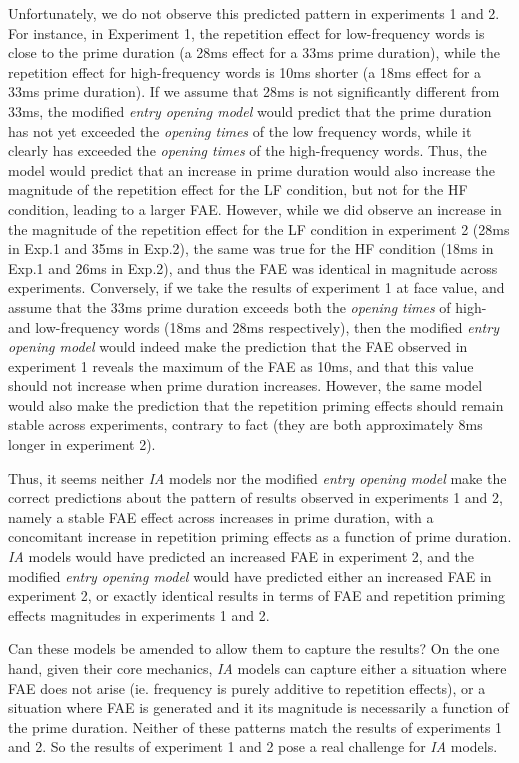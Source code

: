 \documentclass[
]{interact}
\begin{document}
Unfortunately, we do not observe this predicted pattern in experiments 1
and 2. For instance, in Experiment 1, the repetition effect for
low-frequency words is close to the prime duration (a 28ms effect for a
33ms prime duration), while the repetition effect for high-frequency
words is 10ms shorter (a 18ms effect for a 33ms prime duration). If we
assume that 28ms is not significantly different from 33ms, the modified
\emph{entry opening model} would predict that the prime duration has not
yet exceeded the \emph{opening times} of the low frequency words, while
it clearly has exceeded the \emph{opening times} of the high-frequency
words. Thus, the model would predict that an increase in prime duration
would also increase the magnitude of the repetition effect for the LF
condition, but not for the HF condition, leading to a larger FAE.
However, while we did observe an increase in the magnitude of the
repetition effect for the LF condition in experiment 2 (28ms in Exp.1
and 35ms in Exp.2), the same was true for the HF condition (18ms in
Exp.1 and 26ms in Exp.2), and thus the FAE was identical in magnitude
across experiments. Conversely, if we take the results of experiment 1
at face value, and assume that the 33ms prime duration exceeds both the
\emph{opening times} of high- and low-frequency words (18ms and 28ms
respectively), then the modified \emph{entry opening model} would indeed
make the prediction that the FAE observed in experiment 1 reveals the
maximum of the FAE as 10ms, and that this value should not increase when
prime duration increases. However, the same model would also make the
prediction that the repetition priming effects should remain stable
across experiments, contrary to fact (they are both approximately 8ms
longer in experiment 2).

Thus, it seems neither \emph{IA} models nor the modified \emph{entry
opening model} make the correct predictions about the pattern of results
observed in experiments 1 and 2, namely a stable FAE effect across
increases in prime duration, with a concomitant increase in repetition
priming effects as a function of prime duration. \emph{IA} models would
have predicted an increased FAE in experiment 2, and the modified
\emph{entry opening model} would have predicted either an increased FAE
in experiment 2, or exactly identical results in terms of FAE and
repetition priming effects magnitudes in experiments 1 and 2.

Can these models be amended to allow them to capture the results? On the
one hand, given their core mechanics, \emph{IA} models can capture
either a situation where FAE does not arise (ie. frequency is purely
additive to repetition effects), or a situation where FAE is generated
and it its magnitude is necessarily a function of the prime duration.
Neither of these patterns match the results of experiments 1 and 2. So
the results of experiment 1 and 2 pose a real challenge for \emph{IA}
models.
\end{document}
